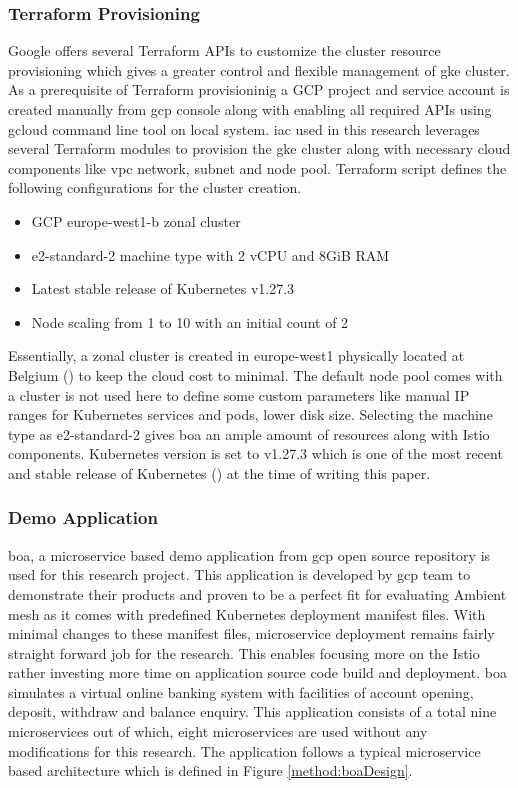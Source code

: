 \subsubsection{Terraform Provisioning}
Google offers several Terraform APIs to customize the cluster resource provisioning which gives a greater control and flexible management of \acrshort{gke} cluster. As a prerequisite of Terraform provisioninig a GCP project and service account is created manually from \acrshort{gcp} console along with enabling all required APIs using gcloud command line tool on local system. \acrfull{iac} used in this research leverages several Terraform modules to provision the \acrshort{gke} cluster along with necessary cloud components like \acrshort{vpc} network, subnet and node pool. Terraform script defines the following configurations for the cluster creation.
\begin{itemize}
  \item GCP europe-west1-b zonal cluster
  \item e2-standard-2 machine type with 2 vCPU and 8GiB RAM
  \item Latest stable release of Kubernetes v1.27.3
  \item Node scaling from 1 to 10 with an initial count of 2
\end{itemize}

Essentially, a zonal cluster is created in europe-west1 physically located at Belgium (\cite{gcpDocRegion}) to keep the cloud cost to minimal. The default node pool comes with a cluster is not used here to define some custom parameters like manual IP ranges for Kubernetes services and pods, lower disk size. Selecting the machine type as e2-standard-2 gives \acrshort{boa} an ample amount of resources along with Istio components. Kubernetes version is set to v1.27.3 which is one of the most recent and stable release of Kubernetes (\cite{kubeDocRelease}) at the time of writing this paper.


\subsubsection{Demo Application}
\acrshort{boa}, a microservice based demo application from \acrshort{gcp} open source repository \cite{githubBOA} is used for this research project. This application is developed by \acrshort{gcp} team to demonstrate their products and proven to be a perfect fit for evaluating Ambient mesh as it comes with predefined Kubernetes deployment manifest files. With minimal changes to these manifest files, microservice deployment remains fairly straight forward job for the research. This enables focusing more on the Istio rather investing more time on application source code build and deployment. \acrshort{boa} simulates a virtual online banking system with facilities of account opening, deposit, withdraw and balance enquiry. This application consists of a total nine microservices out of which, eight microservices are used without any modifications for this research. The application follows a typical microservice based architecture which is defined in Figure \ref{method:boaDesign}.

